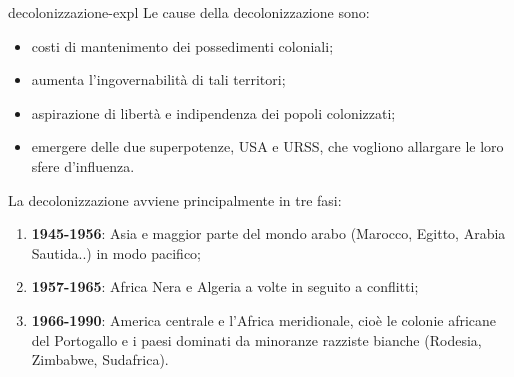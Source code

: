 \documentclass[preview]{standalone}
\begin{document}
\begin{snippet}{decolonizzazione-expl}
    Le cause della decolonizzazione sono:
    \begin{itemize}
        \item costi di mantenimento dei possedimenti coloniali;
        \item aumenta l'ingovernabilità di tali territori;
        \item aspirazione di libertà e indipendenza dei popoli colonizzati;
        \item emergere delle due superpotenze, USA e URSS, che vogliono
        allargare le loro sfere d'influenza.
    \end{itemize}
    
    La decolonizzazione avviene principalmente in tre fasi:
    
    \begin{enumerate}
        \item \textbf{1945-1956}: Asia e maggior parte del mondo arabo (Marocco, Egitto, Arabia Sautida..) in modo pacifico;
        \item \textbf{1957-1965}: Africa Nera e Algeria a volte in seguito a conflitti;
        \item \textbf{1966-1990}: America centrale e l'Africa meridionale, cioè le colonie africane del Portogallo e i
        paesi dominati da minoranze razziste bianche (Rodesia, Zimbabwe, Sudafrica).
    \end{enumerate}
    

\end{snippet}
\end{document}
